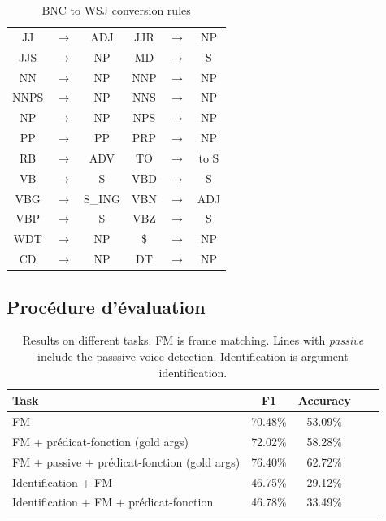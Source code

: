 \begin{table}[ht]
    \centering
    \begin{tabular}{ccc|ccc}
        \toprule
        JJ   &$\to$& ADJ    & JJR  &$\to$& NP     \\
        JJS  &$\to$& NP     & MD   &$\to$& S      \\
        NN   &$\to$& NP     & NNP  &$\to$& NP     \\
        NNPS &$\to$& NP     & NNS  &$\to$& NP     \\
        NP   &$\to$& NP     & NPS  &$\to$& NP     \\
        PP   &$\to$& PP     & PRP  &$\to$& NP     \\  
        RB   &$\to$& ADV    & TO   &$\to$& to S   \\
        VB   &$\to$& S      & VBD  &$\to$& S      \\
        VBG  &$\to$& S\_ING & VBN  &$\to$& ADJ    \\
        VBP  &$\to$& S      & VBZ  &$\to$& S      \\
        WDT  &$\to$& NP     & \$   &$\to$& NP     \\  
        CD   &$\to$& NP     & DT   &$\to$& NP     \\
        \bottomrule
    \end{tabular}
    \caption{\protect\centering\label{table:tagset_rules}BNC to WSJ conversion rules}
\end{table}


\subsection{Procédure d'évaluation}

\begin{table}[ht]
    \centering
    \begin{tabular}{lcccc}
        \toprule
        Task                                           & F1        & Accuracy \\
        \midrule
        FM                                             & 70.48\%   & 53.09\%  \\
        FM + prédicat-fonction (gold args)                & 72.02\%   & 58.28\%  \\
        FM + passive + prédicat-fonction (gold args)      & 76.40\%   & 62.72\%  \\
        \midrule
        Identification + FM                            & 46.75\%   & 29.12\%  \\
        Identification + FM + prédicat-fonction           & 46.78\%   & 33.49\%  \\
        \bottomrule
    \end{tabular}
    \caption{\protect\centering\label{table:results}Results on different tasks. FM is frame matching. Lines with \emph{passive} include the passsive voice detection. Identification is argument identification.}
\end{table}

